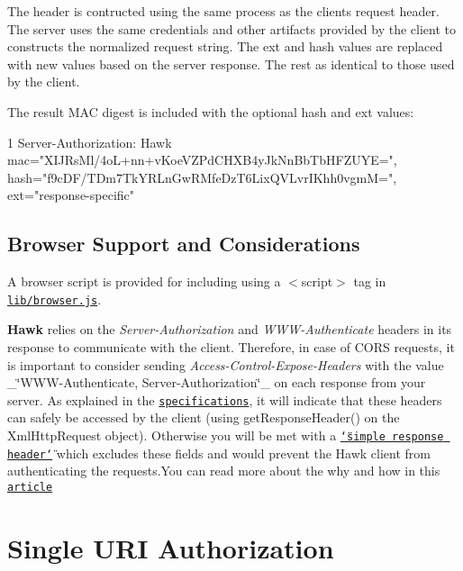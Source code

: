 The header is contructed using the same process as the client\textquotesingle{}s request header. The server uses the same credentials and other artifacts provided by the client to constructs the normalized request string. The {\ttfamily ext} and {\ttfamily hash} values are replaced with new values based on the server response. The rest as identical to those used by the client.

The result M\+A\+C digest is included with the optional {\ttfamily hash} and {\ttfamily ext} values\+:


\begin{DoxyCode}
1 Server-Authorization: Hawk mac="XIJRsMl/4oL+nn+vKoeVZPdCHXB4yJkNnBbTbHFZUYE=",
       hash="f9cDF/TDm7TkYRLnGwRMfeDzT6LixQVLvrIKhh0vgmM=", ext="response-specific"
\end{DoxyCode}


\subsection*{Browser Support and Considerations}

A browser script is provided for including using a {\ttfamily $<$script$>$} tag in \href{/lib/browser.js}{\tt lib/browser.\+js}.

{\bfseries Hawk} relies on the {\itshape Server-\/\+Authorization} and {\itshape W\+W\+W-\/\+Authenticate} headers in its response to communicate with the client. Therefore, in case of C\+O\+R\+S requests, it is important to consider sending {\itshape Access-\/\+Control-\/\+Expose-\/\+Headers} with the value \+\_\+\char`\"{}\+W\+W\+W-\/\+Authenticate, Server-\/\+Authorization\char`\"{}\+\_\+ on each response from your server. As explained in the \href{http://www.w3.org/TR/cors/#access-control-expose-headers-response-header}{\tt specifications}, it will indicate that these headers can safely be accessed by the client (using get\+Response\+Header() on the Xml\+Http\+Request object). Otherwise you will be met with a \href{http://www.w3.org/TR/cors/#simple-response-header}{\tt \char`\"{}simple response header\char`\"{}} which excludes these fields and would prevent the Hawk client from authenticating the requests.\+You can read more about the why and how in this \href{http://www.html5rocks.com/en/tutorials/cors/#toc-adding-cors-support-to-the-server}{\tt article}

\section*{Single U\+R\+I Authorization}

